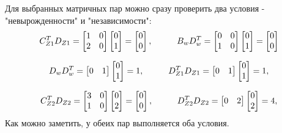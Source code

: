 Для выбранных матричных пар можно сразу проверить два условия - "невырожденности" и "независимости":
$$
  C_{Z1}^T D_{Z1} = \begin{bmatrix}
    1 & 0 \\ 
    2 & 0 \\ 
    \end{bmatrix} \begin{bmatrix}
      0 \\ 1
    \end{bmatrix} = \begin{bmatrix} 0 \\ 0 \end{bmatrix}, \hspace*{1cm} 
    B_w D_w^T = \begin{bmatrix}
      0 & 0 \\ 
      1 & 0 \\ 
      \end{bmatrix} \begin{bmatrix}
        0 \\ 1 
      \end{bmatrix} =  \begin{bmatrix} 0 \\ 0 \end{bmatrix}
$$

$$
  D_w D_w^T = \begin{bmatrix}
    0 & 1 \\ 
    
    \end{bmatrix} \begin{bmatrix}
      0 \\ 1
    \end{bmatrix} = 1, \tab
    D_{Z1}^T D_{Z1} = \begin{bmatrix}
      0 & 1 \\ 
      
      \end{bmatrix} \begin{bmatrix}
        0 \\ 1
      \end{bmatrix} = 1,
$$

$$
  C_{Z2}^T D_{Z2} = \begin{bmatrix}
    3 & 0 \\ 
    1 & 0 \\ 
    \end{bmatrix} \begin{bmatrix}
      0 \\ 2
    \end{bmatrix} = \begin{bmatrix} 0 \\ 0 \end{bmatrix}, \tab 
    D_{Z2}^T D_{Z2} = \begin{bmatrix}
      0 & 2 \\ 
      
      \end{bmatrix} \begin{bmatrix}
        0 \\ 2
      \end{bmatrix} = 4,
$$
Как можно заметить, у обеих пар выполняется оба условия.

\endinput